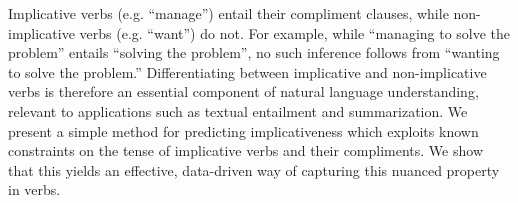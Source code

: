 Implicative verbs (e.g. ``manage'') entail their compliment clauses, while non-implicative verbs (e.g. ``want'') do not. For example, while ``managing to solve the problem'' entails ``solving the problem'', no such inference follows from ``wanting to solve the problem.'' Differentiating between implicative and non-implicative verbs is therefore an essential component of natural language understanding, relevant to applications such as textual entailment and summarization. We present a simple method for predicting implicativeness which exploits known constraints on the tense of implicative verbs and their compliments. We show that this yields an effective, data-driven way of capturing this nuanced property in verbs.
